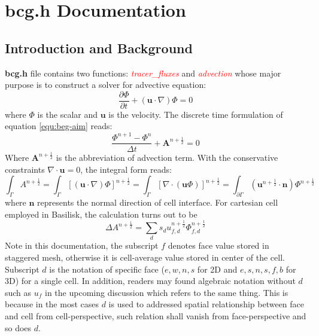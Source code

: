 \chapter{bcg.h Documentation}
\ifsingle
\maketitle
\fi
\chaptermeta[2.0][2025-06-04]

\section{Introduction and Background}\label{sec:bcg-intro}
\textbf{bcg.h} file contains two functions: \textcolor{red}{\emph{tracer\_fluxes}} and \textcolor{red}{\emph{advection}} whose major purpose is to construct a solver for advective equation:
\begin{equation}
  \frac{\partial \Phi}{\partial t} + ( \mathbf{u} \cdot \nabla)\Phi = 0\label{equ:beg-aim}
\end{equation}
where $\Phi$ is the scalar and $ \mathbf{u}$ is the velocity. The discrete time formulation of equation \ref{equ:beg-aim} reads:
\begin{equation}
  \frac{\Phi^{n+1}-\Phi^{n}}{\Delta t} + \mathbf{A}^{n+\frac{1}{2}} = 0 \label{equ:beg-general}
\end{equation}
Where $ \mathbf{A}^{n+ \frac{1}{2}}$ is the abbreviation of advection term. With the conservative constraints $\nabla \cdot \mathbf{u} = 0$, the integral form reads:
\begin{equation}
  \int_{\Gamma} A^{n+ \frac{1}{2}} = \int_{\Gamma} [( \mathbf{u}\cdot \nabla)\Phi]^{n+ \frac{1}{2}} = \int_{\Gamma} [\nabla\cdot( \mathbf{u} \Phi)]^{n+ \frac{1}{2}} = \int_{\partial \Gamma} ( \mathbf{u}^{n + \frac{1}{2}} \cdot \mathbf{n}) \Phi^{n+ \frac{1}{2}}
\end{equation}
where $ \mathbf{n}$ represents the normal direction of cell interface. For cartesian cell employed in Basilisk, the calculation turns out to be
\begin{equation}
  \Delta A^{n+ \frac{1}{2}} = \sum_{d} s_d u_{f,d}^{n+ \frac{1}{2}}\Phi_{f,d}^{n + \frac{1}{2}} 
\end{equation}
Note in this documentation, the subscript $f$ denotes face value stored in staggered mesh\cite{1965_Harlow}, otherwise it is cell-average value stored in center of the cell. Subscript $d$ is the notation of specific face ($e,w,n,s$ for 2D and $e,s,n,s,f,b$ for 3D) for a single cell. In addition, readers may found algebraic notation without $d$ such as $u_f$ in the upcoming discussion which refers to the same thing. This is because in the most cases $d$ is used to addressed spatial relationship between face and cell from cell-perspective, such relation shall vanish from face-perspective and so does $d$.

